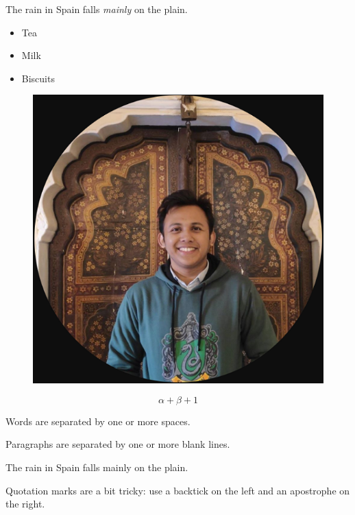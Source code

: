 \documentclass[12pt,a4paper]{article}
\author{Chowdhury Amir Abdullah}
\begin{document}
The rain in Spain falls \emph{mainly} on the plain.


\begin{itemize}
\item Tea
\item Milk
\item Biscuits
\end{itemize}



\begin{figure}[H]
\includegraphics{1}
\end{figure}


\begin{equation}
\alpha + \beta + 1
\end{equation}



Words are separated by one or more
spaces.

Paragraphs are separated by one
or more blank lines.


The rain			 in 					Spain
falls mainly 				on the				 plain.



Quotation marks are a bit tricky:
use a backtick on the left and an apostrophe on the right.
\end{document}
